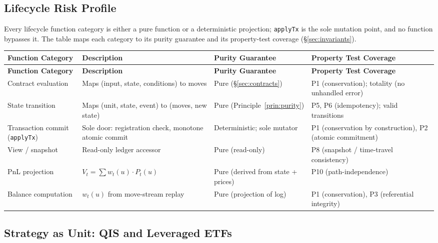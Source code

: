 \subsection{Lifecycle Risk Profile}
\label{sec:risk-profile}

Every lifecycle function category is either a pure function or a deterministic projection; \texttt{applyTx} is the sole mutation point, and no function bypasses it. The table maps each category to its purity guarantee and its property-test coverage (\S\ref{sec:invariants}).

\begin{center}
\begin{longtable}{p{3.2cm} p{4cm} p{2.8cm} p{3.5cm}}
\toprule
\textbf{Function Category} & \textbf{Description} & \textbf{Purity Guarantee} & \textbf{Property Test Coverage} \\
\midrule
\endfirsthead
\toprule
\textbf{Function Category} & \textbf{Description} & \textbf{Purity Guarantee} & \textbf{Property Test Coverage} \\
\midrule
\endhead
Contract evaluation & Maps (input, state, conditions) to moves & Pure (\S\ref{sec:contracts}) & P1 (conservation); totality (no unhandled error) \\
\midrule
State transition & Maps (unit, state, event) to (moves, new state) & Pure (Principle~\ref{prin:purity}) & P5, P6 (idempotency); valid transitions \\
\midrule
Transaction commit (\texttt{applyTx}) & Sole door: registration check, monotone atomic commit & Deterministic; sole mutator & P1 (conservation by construction), P2 (atomic commitment) \\
\midrule
View / snapshot & Read-only ledger accessor & Pure (read-only) & P8 (snapshot / time-travel consistency) \\
\midrule
PnL projection & $V_t = \sum w_t(u) \cdot P_t(u)$ & Pure (derived from state + prices) & P10 (path-independence) \\
\midrule
Balance computation & $w_t(u)$ from move-stream replay & Pure (projection of log) & P1 (conservation), P3 (referential integrity) \\
\bottomrule
\end{longtable}
\end{center}

\subsection{Strategy as Unit: QIS and Leveraged ETFs}

